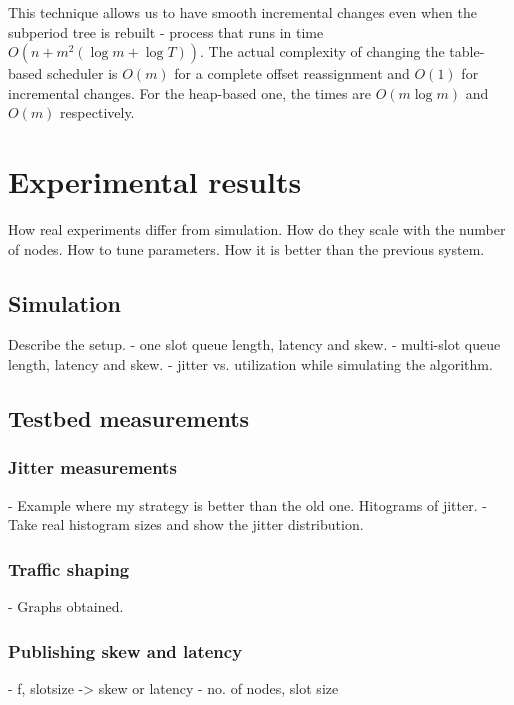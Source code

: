 This technique allows us to have smooth incremental changes even when the subperiod tree is rebuilt - process that runs in time $O(n+m^2(\log m+\log T))$. The actual complexity of changing the table-based scheduler is $O(m)$ for a complete offset reassignment and $O(1)$ for incremental changes. For the heap-based one, the times are $O(m\log m)$ and $O(m)$ respectively.

\section*{Experimental results}
How real experiments differ from simulation.
How do they scale with the number of nodes.
How to tune parameters.
How it is better than the previous system.

\subsection*{Simulation}
Describe the setup.
- one slot queue length, latency and skew.
- multi-slot queue length, latency and skew.
- jitter vs. utilization while simulating the algorithm.

\subsection*{Testbed measurements}
\subsubsection*{Jitter measurements}
- Example where my strategy is better than the old one. Hitograms of jitter.
- Take real histogram sizes and show the jitter distribution.
\subsubsection*{Traffic shaping}
- Graphs obtained.
\subsubsection*{Publishing skew and latency}
- f, slotsize -> skew or latency
- no. of nodes, slot size


